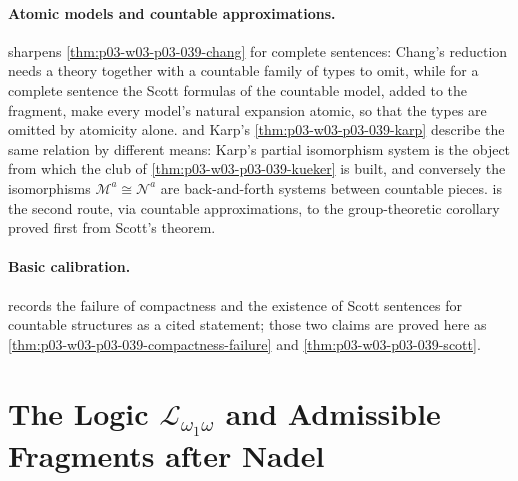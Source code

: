 \paragraph{Atomic models and countable approximations.}
 sharpens
\cref{thm:p03-w03-p03-039-chang} for complete sentences: Chang's reduction
needs a theory together with a countable family of types to omit, while for
a complete sentence the Scott formulas of the countable model, added to the
fragment, make every model's natural expansion atomic, so that the types are
omitted by atomicity alone.  and Karp's
\cref{thm:p03-w03-p03-039-karp} describe the same relation by different
means: Karp's partial isomorphism system is the object from which the club
of \cref{thm:p03-w03-p03-039-kueker} is built, and conversely the
isomorphisms \(\mathcal M^a\cong\mathcal N^a\) are back-and-forth systems
between countable pieces.  is the
second route, via countable approximations, to the group-theoretic
corollary proved first from Scott's theorem.

\paragraph{Basic calibration.} 
records the failure of compactness and the existence of Scott sentences
for countable structures as a cited statement; those two claims are proved
here as \cref{thm:p03-w03-p03-039-compactness-failure} and
\cref{thm:p03-w03-p03-039-scott}.

\section{The Logic \texorpdfstring{\(\mathscr L_{\omega_1\omega}\)}{L omega1 omega} and Admissible Fragments after Nadel}
\label{sec:p03-w03-p03-039-nadel}

